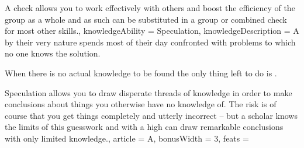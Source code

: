 {A  check allows you to work effectively with others\comma{} and boost the efficiency of the group as a whole\comma{} and as such can be substituted in a group or combined check for most other skills.,
	knowledgeAbility = Speculation,
	knowledgeDescription = A \bname{}\comma{} by their very nature\comma{} spends most of their day confronted with problems to which no one knows the solution. 

When there is no actual knowledge to be found\comma{} the only thing left to do is . 

Speculation allows you to draw disperate threads of knowledge\comma{} in order to make conclusions about things you otherwise have no knowledge of. The risk is\comma{} of course\comma{} that you get things completely and utterly incorrect – but a scholar knows the limits of this guesswork\comma{} and with a high  can draw remarkable conclusions with only limited knowledge.,
	article = A,
	bonusWidth = 3, feats = \ScholarFeats
}

